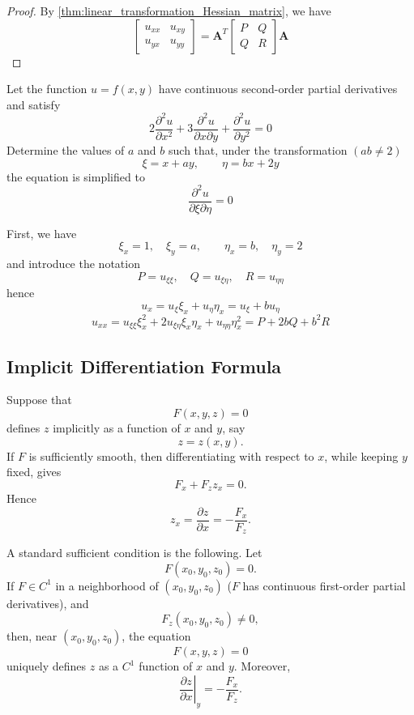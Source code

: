 \documentclass[a4]{overview}
\begin{document}
\begin{proof}
	By \ref{thm:linear_transformation_Hessian_matrix}, we have
	\[
		\begin{bmatrix} u_{xx} & u_{xy}\\ u_{yx} & u_{yy} \end{bmatrix}
		= \boldsymbol{A}^T
		\begin{bmatrix} P & Q\\ Q & R \end{bmatrix}
		\boldsymbol{A}
	\] 
	
\end{proof}

\begin{example}
Let the function \(u=f(x,y)\) have continuous second-order partial derivatives and satisfy
\[
2\frac{\partial^2 u}{\partial x^2}
+3\frac{\partial^2 u}{\partial x\partial y}
+\frac{\partial^2 u}{\partial y^2}=0
\]
Determine the values of \(a\) and \(b\) such that, under the transformation $(ab \neq 2)$
\[
\xi=x+ay,\qquad \eta=bx+2y
\]
the equation is simplified to
\[
\frac{\partial^2 u}{\partial \xi \partial \eta}=0
\]

\begin{answer}

First, we have
\[
\xi_x=1,\quad \xi_y=a,\qquad \eta_x=b,\quad \eta_y=2
\] 
and introduce the notation
\[
	P=u_{\xi\xi},\quad Q=u_{\xi\eta},\quad R=u_{\eta\eta}
\]
hence
\[
	u_x = u_{\xi}\xi_x + u_{\eta}\eta_x = u_{\xi}+bu_{\eta}
\] 
\[
	u_{xx} = u_{\xi\xi}\xi_x^2 + 2u_{\xi\eta}\xi_x\eta_x + u_{\eta\eta}\eta_x^2
= P + 2bQ + b^2R
\] 

	
\end{answer}

\end{example}

\subsection{Implicit Differentiation Formula}

Suppose that
\[
F(x,y,z)=0
\]
defines \(z\) implicitly as a function of \(x\) and \(y\), say
\[
z=z(x,y).
\]
If \(F\) is sufficiently smooth, then differentiating with respect to \(x\), while keeping \(y\) fixed, gives
\[
F_x+F_z z_x=0.
\]
Hence
\[
z_x=\frac{\partial z}{\partial x}
=
-\frac{F_x}{F_z}.
\]

A standard sufficient condition is the following. Let
\[
F(x_0,y_0,z_0)=0.
\]
If \(F\in C^1\) in a neighborhood of \((x_0,y_0,z_0)\) ($F$ has continuous first-order partial derivatives), and
\[
F_z(x_0,y_0,z_0)\neq 0,
\]
then, near \((x_0,y_0,z_0)\), the equation
\[
F(x,y,z)=0
\]
uniquely defines \(z\) as a \(C^1\) function of \(x\) and \(y\). Moreover,
\[
\left.\frac{\partial z}{\partial x}\right|_y
=
-\frac{F_x}{F_z}.
\]
\end{document}
